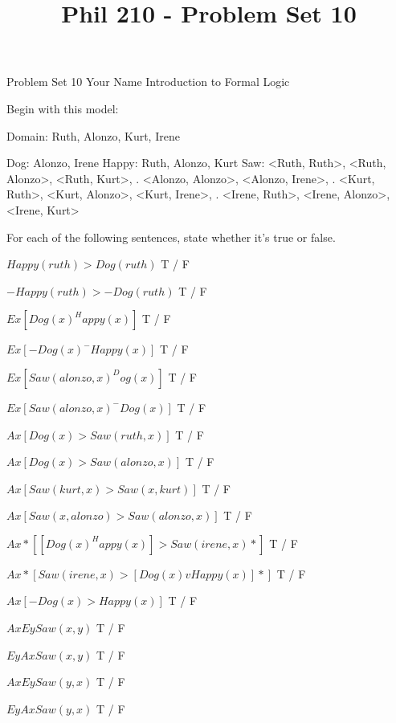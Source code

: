 
\title{Phil 210 - Problem Set 10}

\heading
Problem Set 10
Your Name
Introduction to Formal Logic
\endheading

Begin with this model:

\answer
        \firstordermodel 
        Domain: Ruth, Alonzo, Kurt, Irene

        Dog:    Alonzo, Irene
        Happy:  Ruth, Alonzo, Kurt
        Saw:    <Ruth, Ruth>, <Ruth, Alonzo>, <Ruth, Kurt>,
           .    <Alonzo, Alonzo>, <Alonzo, Irene>,
           .    <Kurt, Ruth>, <Kurt, Alonzo>, <Kurt, Irene>,
           .    <Irene, Ruth>, <Irene, Alonzo>, <Irene, Kurt>
        \endfirstordermodel
\endanswer\bigskip

For each of the following sentences, state whether it's true or false.

\quantifiers
\problems
{}
$ Happy(ruth) > Dog(ruth) $
        \answer
         T / F
        \endanswer

$ -Happy(ruth) > -Dog(ruth) $
        \answer
         T / F
        \endanswer

$ Ex[Dog(x) ^ Happy(x)] $
        \answer
         T / F
        \endanswer

$ Ex[-Dog(x) ^ -Happy(x)] $
        \answer
         T / F
        \endanswer

$ Ex[Saw(alonzo,x) ^ Dog(x)] $
        \answer
         T / F
        \endanswer

$ Ex[Saw(alonzo,x) ^ -Dog(x)] $
        \answer
         T / F
        \endanswer

$ Ax[Dog(x) > Saw(ruth,x)] $
        \answer
         T / F
        \endanswer

$ Ax[Dog(x) > Saw(alonzo,x)] $
        \answer
         T / F
        \endanswer

$ Ax[Saw(kurt,x) > Saw(x,kurt)] $
        \answer
         T / F
        \endanswer

$ Ax[Saw(x,alonzo) > Saw(alonzo,x)] $
        \answer
         T / F
        \endanswer

$ Ax*[[Dog(x) ^ Happy(x)] > Saw(irene,x)*] $
        \answer
         T / F
        \endanswer

$ Ax*[Saw(irene,x) > [Dog(x) v Happy(x)]*] $
        \answer
         T / F
        \endanswer

$ Ax[-Dog(x) > Happy(x)] $
        \answer
         T / F
        \endanswer

$ Ax Ey Saw(x,y) $
        \answer
         T / F
        \endanswer

$ Ey Ax Saw(x,y) $
        \answer
         T / F
        \endanswer

$ Ax Ey Saw(y,x) $
        \answer
         T / F
        \endanswer

$ Ey Ax Saw(y,x) $
        \answer
         T / F
        \endanswer

\endproblems
\bye
